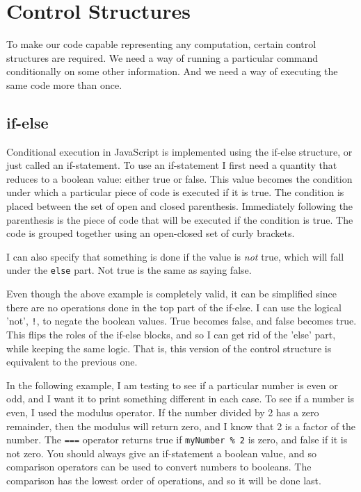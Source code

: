 \chapter{Control Structures}

To make our code capable representing any computation, certain control structures are required. We need a way of running a particular command conditionally on some other information. And we need a way of executing the same code more than once.

\section{if-else}

Conditional execution in JavaScript is implemented using the if-else structure, or just called an if-statement. To use an if-statement I first need a quantity that reduces to a boolean value: either true or false. This value becomes the condition under which a particular piece of code is executed if it is true. The condition is placed between the set of open and closed parenthesis. Immediately following the parenthesis is the piece of code that will be executed if the condition is true. The code is grouped together using an open-closed set of curly brackets.


I can also specify that something is done if the value is \textit{not} true, which will fall under the \texttt{else} part. Not true is the same as saying false.


Even though the above example is completely valid, it can be simplified since there are no operations done in the top part of the if-else. I can use the logical 'not', \texttt{!}, to negate the boolean values. True becomes false, and false becomes true. This flips the roles of the if-else blocks, and so I can get rid of the 'else' part, while keeping the same logic. That is, this version of the control structure is equivalent to the previous one.


In the following example, I am testing to see if a particular number is even or odd, and I want it to print something different in each case. To see if a number is even, I used the modulus operator. If the number divided by 2 has a zero remainder, then the modulus will return zero, and I know that 2 is a factor of the number. The \texttt{===} operator returns true if \texttt{myNumber \% 2} is zero, and false if it is not zero. You should always give an if-statement a boolean value, and so comparison operators can be used to convert numbers to booleans. The comparison has the lowest order of operations, and so it will be done last.\\


